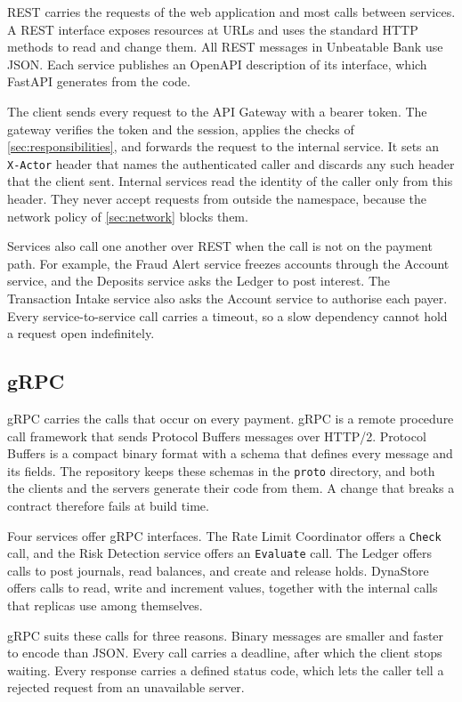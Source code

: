 \documentclass[11pt,a4paper]{article}
\newcommand{\project}{Unbeatable Bank}
\newcommand{\code}[1]{\texttt{#1}}
\begin{document}
REST carries the requests of the web application and most calls between services. A REST interface exposes resources at URLs and uses the standard HTTP methods to read and change them. All REST messages in \project{} use JSON. Each service publishes an OpenAPI description of its interface, which FastAPI generates from the code.

The client sends every request to the API Gateway with a bearer token. The gateway verifies the token and the session, applies the checks of \cref{sec:responsibilities}, and forwards the request to the internal service. It sets an \code{X-Actor} header that names the authenticated caller and discards any such header that the client sent. Internal services read the identity of the caller only from this header. They never accept requests from outside the namespace, because the network policy of \cref{sec:network} blocks them.

Services also call one another over REST when the call is not on the payment path. For example, the Fraud Alert service freezes accounts through the Account service, and the Deposits service asks the Ledger to post interest. The Transaction Intake service also asks the Account service to authorise each payer. Every service-to-service call carries a timeout, so a slow dependency cannot hold a request open indefinitely.

\subsection{gRPC}
\label{sec:grpc}

gRPC carries the calls that occur on every payment. gRPC is a remote procedure call framework that sends Protocol Buffers messages over HTTP/2. Protocol Buffers is a compact binary format with a schema that defines every message and its fields. The repository keeps these schemas in the \code{proto} directory, and both the clients and the servers generate their code from them. A change that breaks a contract therefore fails at build time.

Four services offer gRPC interfaces. The Rate Limit Coordinator offers a \code{Check} call, and the Risk Detection service offers an \code{Evaluate} call. The Ledger offers calls to post journals, read balances, and create and release holds. DynaStore offers calls to read, write and increment values, together with the internal calls that replicas use among themselves.

gRPC suits these calls for three reasons. Binary messages are smaller and faster to encode than JSON. Every call carries a deadline, after which the client stops waiting. Every response carries a defined status code, which lets the caller tell a rejected request from an unavailable server.
\end{document}
